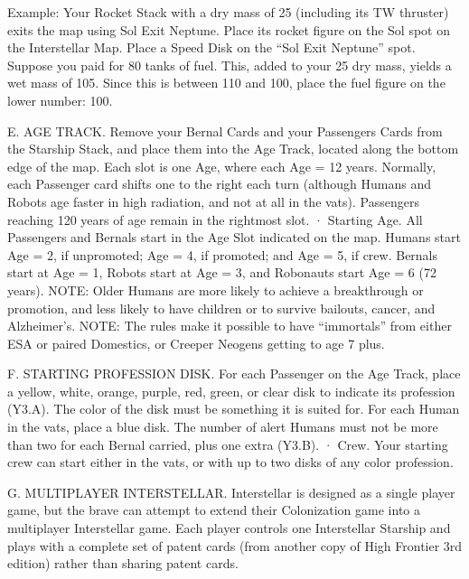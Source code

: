 \documentclass[a4paper]{book}
\begin{document}
Example: Your Rocket Stack with a dry mass of 25 (including its TW thruster) exits the map using Sol Exit Neptune. Place its rocket figure on the Sol spot on the Interstellar Map. Place a Speed Disk on the “Sol Exit Neptune” spot. Suppose you paid for 80 tanks of fuel. This, added to your 25 dry mass, yields a wet mass of 105. Since this is between 110 and 100, place the fuel figure on the lower number: 100.

E. AGE TRACK. Remove your Bernal Cards and your Passengers Cards from the Starship Stack, and place them into the Age Track, located along the bottom edge of the map. Each slot is one Age, where each Age = 12 years. Normally, each Passenger card shifts one to the right each turn (although Humans and Robots age faster in high radiation, and not at all in the vats). Passengers reaching 120 years of age remain in the rightmost slot.
·       Starting Age. All Passengers and Bernals start in the Age Slot indicated on the map. Humans start Age = 2, if unpromoted; Age = 4, if promoted; and Age = 5, if crew. Bernals start at Age = 1, Robots start at Age = 3, and Robonauts start Age = 6 (72 years).
NOTE: Older Humans are more likely to achieve a breakthrough or promotion, and less likely to have children or to survive bailouts, cancer, and Alzheimer’s.
NOTE: The rules make it possible to have “immortals” from either ESA or paired Domestics, or Creeper Neogens getting to age 7 plus.
 
F. STARTING PROFESSION DISK. For each Passenger on the Age Track, place a yellow, white, orange, purple, red, green, or clear disk to indicate its profession (Y3.A). The color of the disk must be something it is suited for. For each Human in the vats, place a blue disk. The number of alert Humans must not be more than two for each Bernal carried, plus one extra (Y3.B).
·       Crew. Your starting crew can start either in the vats, or with up to two disks of any color profession.

G. MULTIPLAYER INTERSTELLAR. Interstellar is designed as a single player game, but the brave can attempt to extend their Colonization game into a multiplayer Interstellar game. Each player controls one Interstellar Starship and plays with a complete set of patent cards (from another copy of High Frontier 3rd edition) rather than sharing patent cards.
\end{document}
